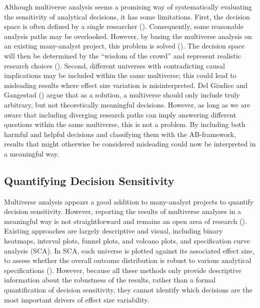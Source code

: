 \documentclass[
  man,
  floatsintext,
  longtable,
  nolmodern,
  notxfonts,
  notimes,
  colorlinks=true,linkcolor=blue,citecolor=blue,urlcolor=blue]{apa7}
\begin{document}
Although multiverse analysis seems a promising way of systematically
evaluating the sensitivity of analytical decisions, it has some
limitations. First, the decision space is often defined by a single
researcher (). Consequently, some reasonable analysis paths may be
overlooked. However, by basing the multiverse analysis on an existing
many-analyst project, this problem is solved
(). The
decision space will then be determined by the ``wisdom of the crowd''
and represent realistic research choices
(). Second,
different universes with contradicting causal implications may be
included within the same multiverse; this could lead to misleading
results where effect size variation is misinterpreted. Del Giudice and
Gangestad () argue that
as a solution, a multiverse should only include truly arbitrary, but not
theoretically meaningful decisions. However, as long as we are aware
that including diverging research paths can imply answering different
questions within the same multiverse, this is not a problem. By
including both harmful and helpful decisions and classifying them with
the AB-framework, results that might otherwise be considered misleading
could now be interpreted in a meaningful way.

\subsection{Quantifying Decision
Sensitivity}\label{quantifying-decision-sensitivity}

Multiverse analysis appears a good addition to many-analyst projects to
quantify decision sensitivity. However, reporting the results of
multiverse analyses in a meaningful way is not straightforward and
remains an open area of research
().
Existing approaches are largely descriptive and visual, including binary
heatmaps, interval plots, funnel plots, and volcano plots, and
specification curve analysis (SCA). In SCA, each universe is plotted
against its associated effect size, to assess whether the overall
outcome distribution is robust to various analytical specifications
().
However, because all these methods only provide descriptive information
about the robustness of the results, rather than a formal quantification
of decision sensitivity, they cannot identify which decisions are the
most important drivers of effect size variability.
\end{document}
